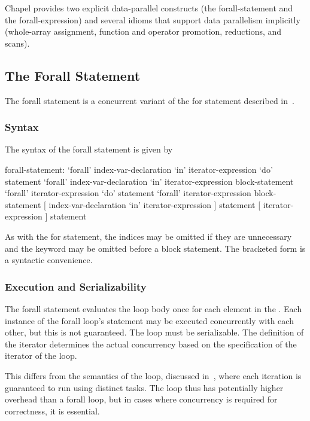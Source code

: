 \label{Data_Parallelism}

Chapel provides two explicit data-parallel constructs (the
forall-statement and the forall-expression) and several idioms that
support data parallelism implicitly (whole-array assignment, function
and operator promotion, reductions, and scans).

\subsection{The Forall Statement}
\label{Forall}

The forall statement is a concurrent variant of the for statement
described in~.

\subsubsection{Syntax}
\label{forall_syntax}

The syntax of the forall statement is given by
\begin{syntax}
forall-statement:
  `forall' index-var-declaration `in' iterator-expression `do' statement
  `forall' index-var-declaration `in' iterator-expression block-statement
  `forall' iterator-expression `do' statement
  `forall' iterator-expression block-statement
  [ index-var-declaration `in' iterator-expression ] statement
  [ iterator-expression ] statement
\end{syntax}
As with the for statement, the indices may be omitted if they are
unnecessary and the  keyword may be omitted before a block
statement.  The bracketed form is a syntactic convenience.

\subsubsection{Execution and Serializability}
\label{forall_semantics}

The forall statement evaluates the loop body once for each element in
the .  Each instance of the forall loop's
statement may be executed concurrently with each other, but this is
not guaranteed.  The loop must be serializable.  The definition of the
iterator determines the actual concurrency based on the specification
of the iterator of the loop.

This differs from the semantics of the  loop, discussed
in~, where each iteration is guaranteed to run using
distinct tasks.  The  loop thus has potentially higher
overhead than a forall loop, but in cases where concurrency is
required for correctness, it is essential.

